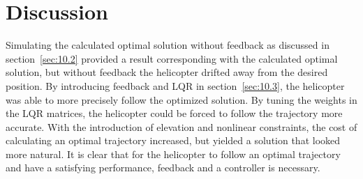 \section{Discussion}\label{sec:discussion}

Simulating the calculated optimal solution without feedback as discussed in section~\ref{sec:10.2} provided a result corresponding with the calculated optimal solution, but without feedback the helicopter drifted away from the desired position. By introducing feedback and LQR in section~\ref{sec:10.3}, the helicopter was able to more precisely follow the optimized solution. By tuning the weights in the LQR matrices, the helicopter could be forced to follow the trajectory more accurate. With the introduction of elevation and nonlinear constraints, the cost of calculating an optimal trajectory increased, but yielded a solution that looked more natural. It is clear that for the helicopter to follow an optimal trajectory and have a satisfying performance, feedback and a controller is necessary. 